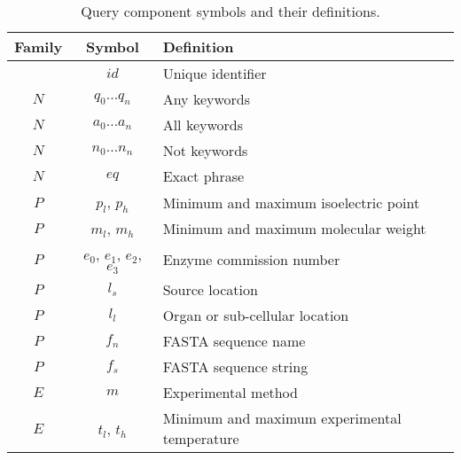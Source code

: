 \begin{table}[H]
\centering
\begin{tabular}{| c | c | l |}
\hline
\textbf{Family} & \textbf{Symbol} & \textbf{Definition}\\
\hline
& $id$ & Unique identifier\\
$N$ & $q_0 \ldots q_n$ & Any keywords\\
$N$ & $a_0 \ldots a_n$ & All keywords\\
$N$ & $n_0 \ldots n_n$ & Not keywords\\
$N$ & $eq$ & Exact phrase\\
$P$ & $p_l$, $p_h$ & Minimum and maximum isoelectric point\\
$P$ & $m_l$, $m_h$ & Minimum and maximum molecular weight\\
$P$ & $e_0$, $e_1$, $e_2$, $e_3$ & Enzyme commission number\\
$P$ & $l_s$ & Source location\\
$P$ & $l_l$ & Organ or sub-cellular location\\
$P$ & $f_n$ & FASTA sequence name\\
$P$ & $f_s$ & FASTA sequence string\\
$E$ & $m$ & Experimental method\\
$E$ & $t_l$, $t_h$ & Minimum and maximum experimental temperature\\
\hline
\end{tabular}
\caption[Query component symbols and their definitions]{Query component symbols and their definitions.}
\label{tab:query-components}
\end{table}



\newpage

